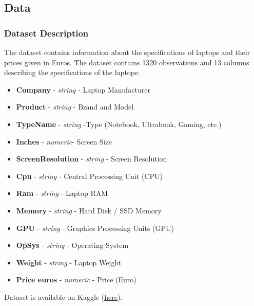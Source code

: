\documentclass[8pt]{beamer}
\begin{document}
\subsection{Data}
\begin{frame}
\frametitle{Dataset Description}
The dataset contains information about the specifications of laptops and their prices given in Euros. The dataset contains 1320 observations and 13 columns describing the specifications of the laptops:
\begin{itemize}
    \item<1-> \textbf{Company} - \textit{string} - Laptop Manufacturer
    \item<1-> \textbf{Product} - \textit{string} - Brand and Model
    \item<1-> \textbf{TypeName} - \textit{string} -Type (Notebook, Ultrabook, Gaming, etc.)
    \item<1-> \textbf{Inches} - \textit{numeric}- Screen Size
    \item<1-> \textbf{ScreenResolution} - \textit{string} - Screen Resolution
    \item<1-> \textbf{Cpu} - \textit{string} - Central Processing Unit (CPU)
    \item<1-> \textbf{Ram} - \textit{string} - Laptop RAM
    \item<1-> \textbf{Memory} - \textit{string} - Hard Disk / SSD Memory
    \item<1-> \textbf{GPU} - \textit{string} - Graphics Processing Units (GPU)
    \item<1-> \textbf{OpSys} - \textit{string} - Operating System
    \item<1-> \textbf{Weight} - \textit{string} - Laptop Weight
    \item<1-> \textbf{Price euros} - \textit{numeric} - Price (Euro)
\end{itemize}
Dataset is available on Kaggle (\href{https://www.kaggle.com/datasets/muhammetvarl/laptop-price}{\underline{here}}).
\end{frame}
\end{document}
